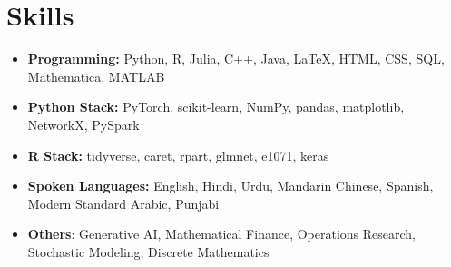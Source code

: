 \documentclass[letterpaper,10pt]{article}
\newcommand\indentsize{10pt}
\newcommand\vspacesize{-10pt}
\begin{document}
\section{Skills}
\begin{itemize}[leftmargin=0.15in, label=]
    \item \textbf{Programming:} Python, R, Julia, C++, Java, \LaTeX, HTML, CSS, SQL, Mathematica, MATLAB
    \item \vspace{-5pt} \textbf{Python Stack:} PyTorch, scikit-learn, NumPy, pandas, matplotlib, NetworkX, PySpark
    \item \vspace{-5pt} \textbf{R Stack:} tidyverse, caret, rpart, glmnet, e1071, keras
    \item \vspace{-5pt} \textbf{Spoken Languages:} English, Hindi, Urdu, Mandarin Chinese, Spanish, Modern Standard Arabic, Punjabi
    \item \vspace{-5pt} \textbf{Others}: Generative AI, Mathematical Finance, Operations Research, Stochastic Modeling, Discrete Mathematics
\end{itemize}
\vspace{\vspacesize}

\newcommand{\resumeProjectHeading}[2]{
    \item \normalsize
    \begin{tabular*}{0.97\textwidth}{l@{\extracolsep{\fill}}r}
        #1 & #2 \\
    \end{tabular*}%
}
\newcommand{\resumeProjectListStart}{\begin{itemize}[leftmargin=\indentsize, label=]\vspace{-7pt}}
\newcommand{\resumeProjectListEnd}{\end{itemize}\vspace{-5pt}}
\end{document}
